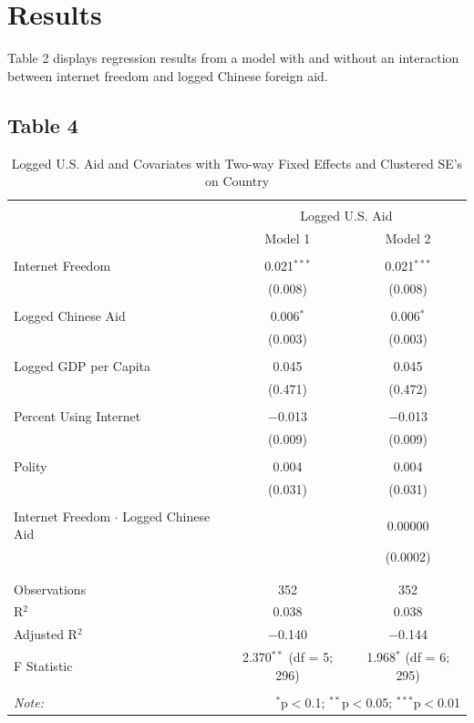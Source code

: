 \documentclass[12pt]{article}
\begin{document}
\pagebreak
\section*{Results}
Table 2 displays regression results from a model with and without an interaction between internet freedom and logged Chinese foreign aid.
\subsection*{Table 4}
\begin{table}[!htbp] \centering 
  \caption*{Logged U.S. Aid and Covariates with Two-way Fixed Effects and Clustered SE's on Country}
  \label{} 
\begin{tabular}{@{\extracolsep{5pt}}lcc} 
\\[-1.8ex]\hline 
\hline \\[-1.8ex] 
 & \multicolumn{2}{c}{Logged U.S. Aid} \\ 
\cline{2-3} 
 & Model 1 & Model 2 \\ 
\hline \\[-1.8ex] 
 Internet Freedom & 0.021$^{***}$ & 0.021$^{***}$ \\ 
  & (0.008) & (0.008) \\ 
  & & \\ 
 Logged Chinese Aid & 0.006$^{*}$ & 0.006$^{*}$ \\ 
  & (0.003) & (0.003) \\ 
  & & \\ 
 Logged GDP per Capita & 0.045 & 0.045 \\ 
  & (0.471) & (0.472) \\ 
  & & \\ 
 Percent Using Internet & $-$0.013 & $-$0.013 \\ 
  & (0.009) & (0.009) \\ 
  & & \\ 
 Polity & 0.004 & 0.004 \\ 
  & (0.031) & (0.031) \\ 
  & & \\ 
 Internet Freedom $\cdot$ Logged Chinese Aid &  & 0.00000 \\ 
  &  & (0.0002) \\ 
  & & \\ 
\hline \\[-1.8ex] 
Observations & 352 & 352 \\ 
R$^{2}$ & 0.038 & 0.038 \\ 
Adjusted R$^{2}$ & $-$0.140 & $-$0.144 \\ 
F Statistic & 2.370$^{**}$ (df = 5; 296) & 1.968$^{*}$ (df = 6; 295) \\ 
\hline 
\hline \\[-1.8ex] 
\textit{Note:}  & \multicolumn{2}{r}{$^{*}$p$<$0.1; $^{**}$p$<$0.05; $^{***}$p$<$0.01} \\ 
\end{tabular} 
\end{table}
\pagebreak
\end{document}
